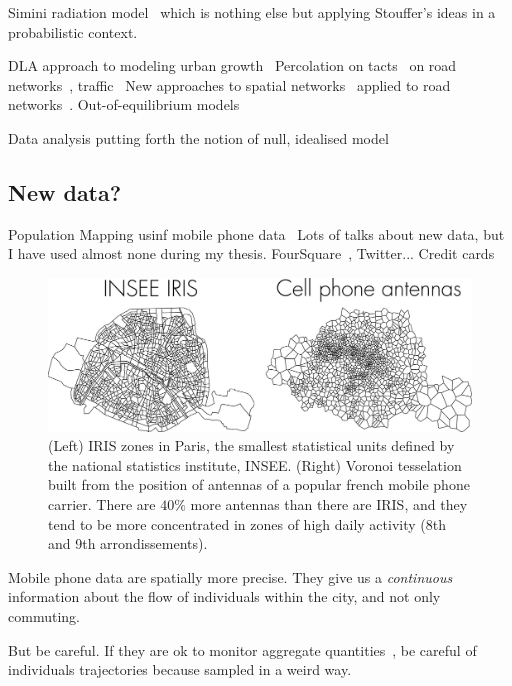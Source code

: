 Simini radiation model~\cite{Simini:2012,Simini:2013} which is nothing else but
applying Stouffer's ideas in a probabilistic context.

DLA approach to modeling urban growth~\cite{Makse:1995}
Percolation on tacts~\cite{Rozenfel:2008} on road networks~\cite{Masucci:2015},
traffic~\cite{Li:2015}
New approaches to spatial networks~\cite{Barthelemy:2011} applied to road
networks~\cite{Barthelemy:2008}.
Out-of-equilibrium models~\cite{Louf:2013_polycentric}

Data analysis putting forth the notion of null, idealised
model~\cite{Louf:2014_scaling}

    \subsection{New data?}
    \label{sub:new_data}

Population Mapping usinf mobile phone data~\cite{Deville:2014}
Lots of talks about new data, but I have used almost none during my thesis.
FourSquare~\cite{Noulas:2012}, Twitter... Credit cards~\cite{Lenormand:2015}

\begin{figure}
    \centering
    \includegraphics[width=\textwidth]{gfx/chapter-intro/IRIS_phone.pdf}
    \caption{(Left) IRIS zones in Paris, the smallest statistical units defined
    by the national statistics institute, INSEE. (Right) Voronoi tesselation
    built from the position of antennas of a popular french mobile phone carrier.
    There are $40\%$ more antennas than there are IRIS, and they tend to be more
    concentrated in zones of high daily activity (8th and 9th
    arrondissements).\label{fig:IRIS_phone}}
\end{figure}

Mobile phone data are spatially more precise. They give us a \emph{continuous}
information about the flow of individuals within the city, and not only
commuting.

But be careful. If they are ok to monitor aggregate
quantities~\cite{Lenormand:2014}, be careful of
individuals trajectories because sampled in a weird way.


